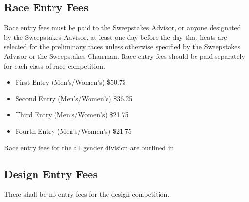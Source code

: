 \subsection{Race Entry Fees}

	Race entry fees must be paid to the Sweepstakes Advisor, or anyone designated by the Sweepstakes Advisor, at least one day before the day that heats are selected for the preliminary races unless otherwise specified by the Sweepstakes Advisor or the Sweepstakes Chairman. Race entry fees should be paid separately for each class of race competition.

	\begin{itemize}
		\item First Entry (Men's/Women's) \$50.75
		\item Second Entry (Men's/Women's) \$36.25
		\item Third Entry (Men's/Women's) \$21.75
		\item Fourth Entry (Men's/Women's) \$21.75
	\end{itemize}

	Race entry fees for the all gender division are outlined in \label{All Gender}

\subsection{Design Entry Fees}

	There shall be no entry fees for the design competition.


